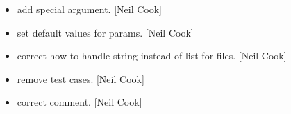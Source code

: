 \documentclass[a4paper,10pt,english]{report}
\begin{document}
\begin{itemize}
\item {} 
 \sphinxhyphen{} add  special argument. {[}Neil Cook{]}

\item {} 
 \sphinxhyphen{} set default values for params. {[}Neil Cook{]}

\item {} 
 \sphinxhyphen{} correct how to handle string instead of list for
files. {[}Neil Cook{]}

\item {} 
 \sphinxhyphen{} remove test cases. {[}Neil Cook{]}

\item {} 
 \sphinxhyphen{} correct comment. {[}Neil Cook{]}

\end{itemize}
\end{document}
